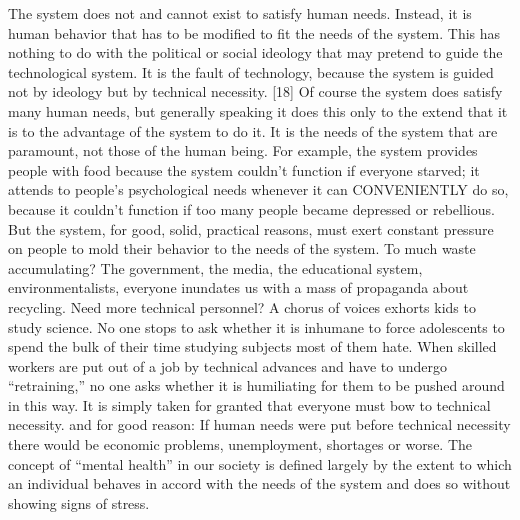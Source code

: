  The system does not and cannot exist to satisfy human needs. Instead, it is human behavior that has to be modified to fit the needs of the system. This has nothing to do with the political or social ideology that may pretend to guide the technological system. It is the fault of technology, because the system is guided not by ideology but by technical necessity. [18] Of course the system does satisfy many human needs, but generally speaking it does this only to the extend that it is to the advantage of the system to do it. It is the needs of the system that are paramount, not those of the human being. For example, the system provides people with food because the system couldn’t function if everyone starved; it attends to people’s psychological needs whenever it can CONVENIENTLY do so, because it couldn’t function if too many people became depressed or rebellious. But the system, for good, solid, practical reasons, must exert constant pressure on people to mold their behavior to the needs of the system. To much waste accumulating? The government, the media, the educational system, environmentalists, everyone inundates us with a mass of propaganda about recycling. Need more technical personnel? A chorus of voices exhorts kids to study science. No one stops to ask whether it is inhumane to force adolescents to spend the bulk of their time studying subjects most of them hate. When skilled workers are put out of a job by technical advances and have to undergo “retraining,” no one asks whether it is humiliating for them to be pushed around in this way. It is simply taken for granted that everyone must bow to technical necessity. and for good reason: If human needs were put before technical necessity there would be economic problems, unemployment, shortages or worse. The concept of “mental health” in our society is defined largely by the extent to which an individual behaves in accord with the needs of the system and does so without showing signs of stress.

